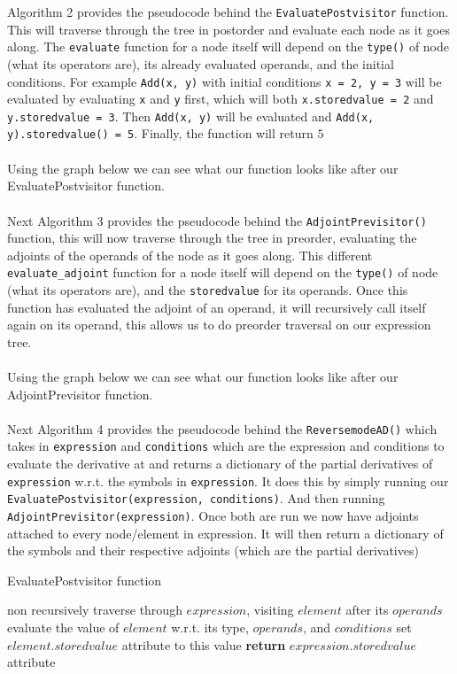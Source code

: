 \documentclass{article}
\begin{document}
Algorithm 2 provides the pseudocode behind the \verb|EvaluatePostvisitor| function. This will traverse through the tree in postorder and evaluate each node as it goes along. The \verb|evaluate| function for a node itself will depend on the \verb|type()| of node (what its operators are), its already evaluated operands, and the initial conditions. For example \verb|Add(x, y)| with initial conditions \verb|x = 2, y = 3| will be evaluated by evaluating \verb|x| and \verb|y| first, which will both \verb|x.storedvalue = 2| and \verb|y.storedvalue = 3|. Then \verb|Add(x, y)| will be evaluated and \verb|Add(x, y).storedvalue() = 5|. Finally, the function will return $5$
\\\\
Using the graph below we can see what our function looks like after our EvaluatePostvisitor function.
\\\\
Next Algorithm 3 provides the pseudocode behind the \verb|AdjointPrevisitor()| function, this will now traverse through the tree in preorder, evaluating the adjoints of the operands of the node as it goes along. This different \verb|evaluate_adjoint| function for a node itself will depend on the \verb|type()| of node (what its operators are), and the \verb|storedvalue| for its operands. Once this function has evaluated the adjoint of an operand, it will recursively call itself again on its operand, this allows us to do preorder traversal on our expression tree.
\\\\
Using the graph below we can see what our function looks like after our AdjointPrevisitor function.
\\\\
Next Algorithm 4 provides the pseudocode behind the \verb|ReversemodeAD()| which takes in \verb|expression| and \verb|conditions| which are the expression and conditions to evaluate the derivative at and returns a dictionary of the partial derivatives of \verb|expression| w.r.t. the symbols in \verb|expression|. It does this by simply running our \verb|EvaluatePostvisitor(expression, conditions)|. And then running \verb|AdjointPrevisitor(expression)|. Once both are run we now have adjoints attached to every node/element in expression. It will then return a dictionary of the symbols and their respective adjoints (which are the partial derivatives)

\begin{algorithm}[h]
\caption{EvaluatePostvisitor function}\label{EvaluatePostvisitor}
\begin{algorithmic}[1]
\State non recursively traverse through $expression$, visiting $element$ after its $operands$
\State evaluate the value of $element$ w.r.t. its type, $operands$, and $conditions$
\State set $element$.$storedvalue$ attribute to this value
\EndFor
\State \textbf{return} $expression$.$storedvalue$ attribute 
\EndProcedure
\end{algorithmic}
\end{algorithm}
\end{document}

